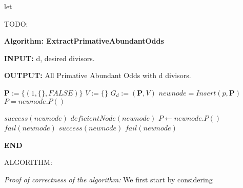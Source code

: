 \documentclass[../paper.tex]{subfiles}
\begin{document}
let 

\begin {algorithmic}
\STATE TODO: 

\end {algorithmic}

{\setlength{\parindent}{0cm}

\textbf{Algorithm: ExtractPrimativeAbundantOdds}

\textbf{INPUT:} d, desired divisors.

\textbf{OUTPUT:} All Primative Abundant Odds with d divisors.

}

\begin{algorithmic}

\STATE $\mathbf{P} := \{(1, \{\}, FALSE)\}$
\STATE $V := \{\}$
\STATE $G_d := (\mathbf{P},V)$
	\STATE $newnode = Insert(p,\mathbf{P})$ 
	\STATE $P = newnode.P()$
	\STATE


			\STATE $success(newnode)$
		\ELSE
			\STATE $deficientNode(newnode)$
			\STATE $P \leftarrow newnode.P()$
		\ENDIF
	\ENDIF
			\STATE $fail(newnode)$
		\ENDIF
			\STATE $success(newnode)$
		\ELSE
			\STATE $fail(newnode)$
		\ENDIF
	\ENDIF

\ENDWHILE
%
\end{algorithmic}

\textbf{END}


ALGORITHM:



\textit{Proof of correctness of the algorithm:}
We first start by considering 
\end{document}
